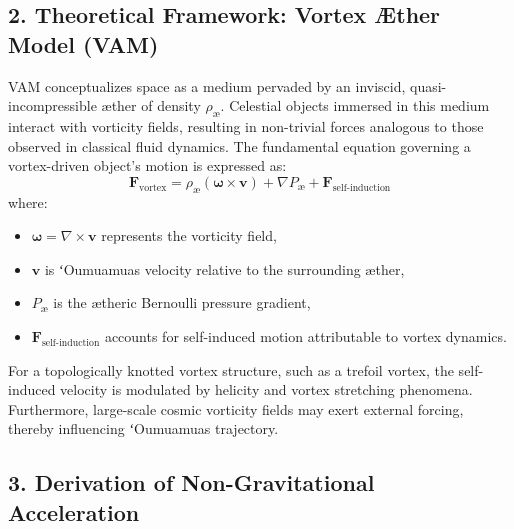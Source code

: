     \subsection*{2. Theoretical Framework: Vortex Æther Model (VAM)}
    VAM conceptualizes space as a medium pervaded by an inviscid, quasi-incompressible æther of density $\rho_\text{\ae}$. Celestial objects immersed in this medium interact with vorticity fields, resulting in non-trivial forces analogous to those observed in classical fluid dynamics. The fundamental equation governing a vortex-driven object's motion is expressed as:
    \begin{equation*}
        \mathbf{F}_\text{vortex} = \rho_\text{\ae} (\mathbf{\omega} \times \mathbf{v}) + \nabla P_\text{\ae} + \mathbf{F}_\text{self-induction}
    \end{equation*}
    where:
    \begin{itemize}
        \item $\mathbf{\omega} = \nabla \times \mathbf{v}$ represents the vorticity field,
        \item $\mathbf{v}$ is ʻOumuamua\rqs s velocity relative to the surrounding æther,
        \item $P_\text{\ae}$ is the ætheric Bernoulli pressure gradient,
        \item $\mathbf{F}_\text{self-induction}$ accounts for self-induced motion attributable to vortex dynamics.
    \end{itemize}
    For a topologically knotted vortex structure, such as a trefoil vortex, the self-induced velocity is modulated by helicity and vortex stretching phenomena. Furthermore, large-scale cosmic vorticity fields may exert external forcing, thereby influencing ʻOumuamua\rqs s trajectory.

    \subsection*{3. Derivation of Non-Gravitational Acceleration}

